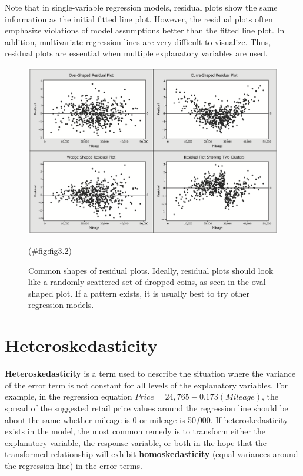 \documentclass[
]{report}
\begin{document}
Note that in single-variable regression models, residual plots show the same information as the initial fitted line plot. However, the residual plots often emphasize violations of model assumptions better than the fitted line plot. In addition, multivariate regression lines are very difficult to visualize. Thus, residual plots are essential
when multiple explanatory variables are used.

\begin{figure}

{\centering \includegraphics[width=1\linewidth]{docs/Fig3_2} 

}

\caption{Common shapes of residual plots. Ideally, residual plots should look like a randomly scattered set of dropped coins, as seen in the oval-shaped plot. If a pattern exists, it is usually best to try other regression models.}(\#fig:fig3.2)
\end{figure}

\section*{Heteroskedasticity}\label{heteroskedasticity}

\textbf{Heteroskedasticity} is a term used to describe the situation where the variance of the error term is not constant for all levels of the explanatory variables. For example, in the regression equation \(Price = 24,765 - 0.173 (Mileage)\), the spread of the suggested retail price values around the regression line should be about the same whether mileage is 0 or mileage is 50,000. If heteroskedasticity exists in the model, the most common remedy is to transform either the explanatory variable, the response variable, or both in the hope that the transformed relationship will exhibit \textbf{homoskedasticity} (equal variances around the regression line) in the error terms.
\end{document}
